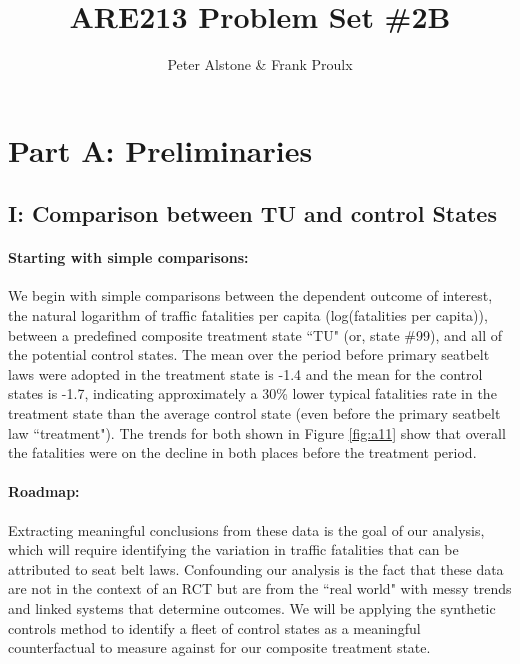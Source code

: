 \documentclass[letterpaper, 12pt]{article}
\begin{document}
\title{ARE213 Problem Set \#2B}
\author{Peter Alstone \& Frank Proulx}
\maketitle

\section{Part A: Preliminaries}

\subsection{I: Comparison between TU and control States}

\paragraph{Starting with simple comparisons:}
We begin with simple comparisons between the dependent outcome of interest, the natural logarithm of traffic fatalities per capita (log(fatalities per capita)), between a predefined composite treatment state ``TU" (or, state \#99), and all of the potential control states.  The mean over the period before primary seatbelt laws were adopted in the treatment state is -1.4 and the mean for the control states is -1.7, indicating approximately a 30\% lower typical fatalities rate in the treatment state than the average control state (even before the primary seatbelt law ``treatment").  The trends for both shown in Figure \ref{fig:a11} show that overall the fatalities were on the decline in both places before the treatment period.  

\paragraph{Roadmap:}
Extracting meaningful conclusions from these data is the goal of our analysis, which will require identifying the variation in traffic fatalities that can be attributed to seat belt laws.  Confounding our analysis is the fact that these data are not in the context of an RCT but are from the ``real world" with messy trends and linked systems that determine outcomes.  We will be applying the synthetic controls method to identify a fleet of control states as a meaningful counterfactual to measure against for our composite treatment state.  
\end{document}
